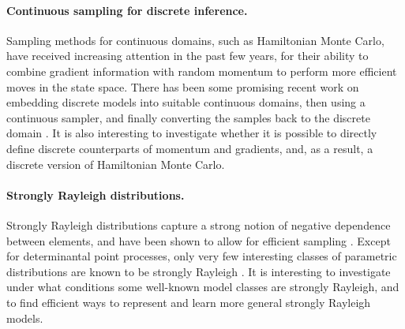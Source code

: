 \paragraph{Continuous sampling for discrete inference.}
Sampling methods for continuous domains, such as Hamiltonian Monte Carlo, have received increasing attention in the past few years, for their ability to combine gradient information with random momentum to perform more efficient moves in the state space.
There has been some promising recent work on embedding discrete models into suitable continuous domains, then using a continuous sampler, and finally converting the samples back to the discrete domain \citep{zhang12,pakman13,dinh17,nishimura18}.
It is also interesting to investigate whether it is possible to directly define discrete counterparts of momentum and gradients, and, as a result, a discrete version of Hamiltonian Monte Carlo.

\paragraph{Strongly Rayleigh distributions.}
Strongly Rayleigh \citep{borcea08} distributions capture a strong notion of negative dependence between elements, and have been shown to allow for efficient sampling \citep{anari16,li16}.
Except for determinantal point processes, only very few interesting classes of parametric distributions are known to be strongly Rayleigh \citep{li17}.
It is interesting to investigate under what conditions some well-known model classes are strongly Rayleigh, and to find efficient ways to represent and learn more general strongly Rayleigh models.